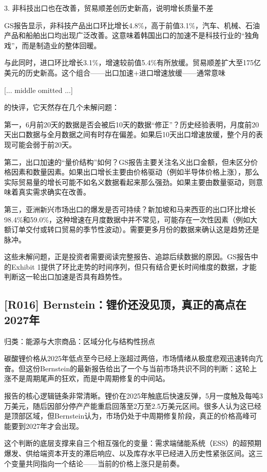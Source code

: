 \documentclass[11pt]{ctexart}
\begin{document}
3. 非科技出口也在改善，贸易顺差创历史新高，说明增长质量不差

GS报告显示，非科技产品出口环比增长4.8\%，高于前值3.1\%，汽车、机械、石油产品和船舶出口均出现广泛改善。这意味着韩国出口的加速不是科技行业的“独角戏”，而是制造业的整体回暖。

与此同时，进口环比增长3.1\%，增速较前值5.4\%有所放缓。贸易顺差扩大至175亿美元的历史新高。这个组合——出口加速+进口增速放缓——通常意味

[... middle omitted ...]

的快评，它天然存在几个未解问题：

第一，6月前20天的数据是否会被后10天的数据“修正”？历史经验表明，月度前20天出口数据与全月数据之间有时存在偏差。如果后10天出口增速放缓，整个月的表现可能会弱于前20天。

第二，出口加速的“量价结构”如何？GS报告主要关注名义出口金额，但未区分价格因素和数量因素。如果出口增长主要由价格驱动（例如半导体价格上涨），那么实际贸易量的增长可能不如名义数据看起来那么强劲。如果主要由数量驱动，则意味着真实需求确实在改善。

第三，亚洲新兴市场出口的爆发是否可持续？新加坡和马来西亚的出口环比增长98.4\%和59.0\%，这种增速在月度数据中并不常见，可能存在一次性因素（例如大额订单交付或转口贸易的季节性波动）。需要更多月份的数据来确认这是趋势还是脉冲。

这些未解问题，正是投资者需要阅读完整报告、追踪后续数据的原因。GS报告中的Exhibit 1提供了环比走势的时间序列，但只有结合更长时间维度的数据，才能判断这一轮出口加速是否具有趋势性。

\subsection{[R016] Bernstein：锂价还没见顶，真正的高点在2027年}
{\small\color{refgray}归类：能源与大宗商品：区域分化与结构性拐点}

碳酸锂价格从2025年低点至今已经上涨超过两倍，市场情绪从极度悲观迅速转向亢奋。但这份Bernstein的最新报告给出了一个与当前市场共识不同的判断：这轮上涨不是周期尾声的狂欢，而是中周期修复的中间站。

报告的核心逻辑链条非常清晰。锂价在2025年触底后快速反弹，5月一度触及每吨3万美元，随后因部分停产产能重启回落至2万至2.5万美元区间。很多人认为这已经是顶部区域，但Bernstein认为，市场仍处于中周期修复阶段，真正的价格高峰可能要到2027年才会出现。

这个判断的底层支撑来自三个相互强化的变量：需求端储能系统（ESS）的超预期爆发、供给端资本开支的滞后响应、以及库存水平已经进入历史性紧张区间。这三个变量共同指向一个结论——当前的价格上涨只是前奏。
\end{document}
